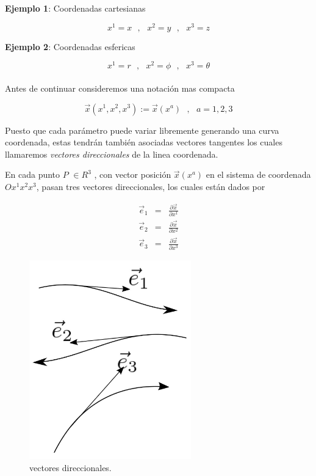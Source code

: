 \documentclass[12pt]{report}
\begin{document}
\textbf{Ejemplo 1}: Coordenadas cartesianas 

\begin{equation}\nonumber
x^1=x \ \ \ , \ \ \ x^2 = y \ \ \ ,  \ \ \ x^3=z
\end{equation}

\textbf{Ejemplo 2}: Coordenadas esfericas

\begin{equation}\nonumber 
x^1=r \ \ \ , \ \ \ x^2 = \phi \ \ \ ,  \ \ \ x^3=\theta
\end{equation} 
\\

Antes de continuar consideremos una notación mas compacta

\begin{equation}
\vec{x}(x^1,x^2,x^3):=\vec{x}(x^a) \ \ \ , \ \ \ a=1,2,3
\end{equation}


Puesto que cada parámetro puede variar libremente generando una curva coordenada, estas tendrán también asociadas vectores tangentes los cuales llamaremos \textit{vectores direccionales} de la linea coordenada.

En cada punto $P$ $\in R^3$ , con vector posición $\vec{x}(x^a)$ en el  sistema de coordenada $Ox^1x^2x^3$, pasan tres vectores direccionales, los cuales están dados por

\begin{eqnarray} \label{2.23}
\vec{e}_1 &=& \frac{\partial \vec{x}}{\partial x^1} \\
\vec{e}_2 &=& \frac{\partial \vec{x}}{\partial x^2} \\ \label{2.24}
\vec{e}_3 &=& \frac{\partial \vec{x}}{\partial x^3}    \label{2.25}
\end{eqnarray}

\begin{figure}[H]
	\centering
	\includegraphics[width=7cm]{figura61.png}
	\caption{ vectores direccionales.}
	\label{fig.1}
\end{figure}
\end{document}
